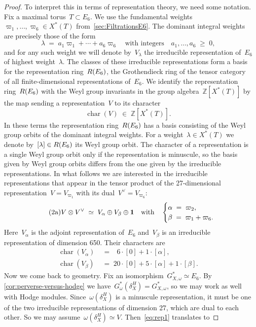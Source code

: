 \documentclass[a4paper]{amsart}
\newcommand{\bbZ}{\mathbb{Z}}
\newcommand{\rR}{\textup{R}}
\DeclareMathOperator{\characteristic}{char}
\renewcommand{\ge}{\geqslant}
\theoremstyle{plain}
\theoremstyle{definition}
\numberwithin{equation}{section}
\begin{document}
\begin{proof}
To interpret this in terms of representation theory, we need some notation. Fix a maximal torus~$T\subset E_6$. We use the fundamental weights~$\varpi_1, \dots, \varpi_6 \in X^\ast(T)$ from~\cref{sec:FiltrationsE6}. The dominant integral weights are precisely those of the form
%
\[
 \lambda \;=\; a_1 \varpi_1 + \cdots + a_6\varpi_6 
 \quad \text{with integers} \quad a_1, \dots, a_6 \;\ge\; 0,
\]
%
and for any such weight we will denote by~$V_\lambda$ the irreducible representation of~$E_6$ of highest weight~$\lambda$. The classes of these irreducible representations form a basis for the representation ring~$\rR(E_6)$, the Grothendieck ring of the tensor category of all finite-dimensional representations of~$E_6$. We identify the representation ring~$\rR(E_6)$ with the Weyl group invariants in the group algebra~$\bbZ[X^\ast(T)]$ by the map sending a representation~$V$ to its character
%
\[
 \characteristic(V) \;\in\; \bbZ[X^\ast(T)].
\]
%
In these terms the representation ring~$\rR(E_6)$ has a basis consisting of the Weyl group orbits of the dominant integral weights. For a weight~$\lambda \in X^\ast(T)$ we denote by~$[\lambda]\in \rR(E_6)$ its Weyl group orbit. The character of a representation is a single Weyl group orbit only if the representation is minuscule, so the basis given by Weyl group orbits differs from the one given by the irreducible representations. In what follows we are interested in the irreducible representations that appear in the tensor product of the 27-dimensional representation~$V=V_{\varpi_1}$ with its dual~$V^\vee = V_{\varpi_6}$:
%
\begin{equation} \label{eq:rep1} \tag{2a}
V\otimes V^\vee
\;\simeq\; V_{\alpha} \oplus V_{\beta} \oplus \bf{1}
\quad \text{with} \quad 
\begin{cases} 
\alpha \;=\; \varpi_2, \\
\beta \;=\; \varpi_1 + \varpi_6.
\end{cases} 
\end{equation}
%
Here~$V_{\alpha}$ is the adjoint representation of~$E_6$ and~$V_{\beta}$ is an irreducible representation of dimension 650. Their characters are
%
\begin{align} \label{eq:rep2} \tag{2b}
 \characteristic(V_{\alpha}) &\;=\; \phantom{0}6\cdot [0] + 1 \cdot [\alpha] , \\ \label{eq:rep3} \tag{2c}
 \characteristic(V_{\beta}) &\;=\; 20 \cdot [0] + 5\cdot [\alpha] + 1 \cdot [\beta].
\end{align}
%
Now we come back to geometry. Fix an isomorphism~$G_{X,\omega}^\ast \simeq E_6$. By \cref{cor:perverse-versus-hodge} we have~$G_\omega^\ast(\delta_X^H) = G_{X,\omega}^\ast$, so we may work as well with Hodge modules. Since~$\omega(\delta_X^H)$ is a minuscule representation, it must be one of the two irreducible representations of dimension 27, which are dual to each other. So we may assume~$\omega(\delta_X^H)\simeq V$. Then~\cref{eq:rep1} translates to

\end{proof}
\end{document}
